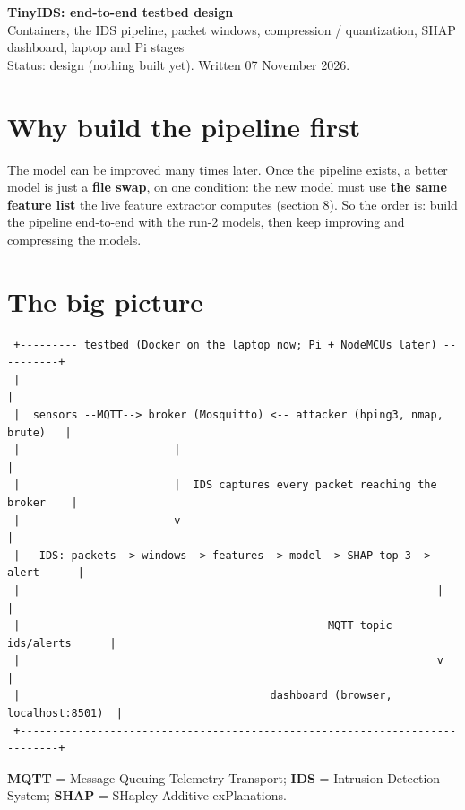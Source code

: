 \documentclass[11pt]{article}
\begin{document}
{\LARGE\bfseries TinyIDS: end-to-end testbed design}\\[4pt]
{\large Containers, the IDS pipeline, packet windows, compression / quantization, SHAP dashboard, laptop and Pi stages}\\[2pt]
Status: design (nothing built yet). Written 07 November 2026.

\tableofcontents

\newpage
\section{Why build the pipeline first}
The model can be improved many times later. Once the pipeline exists, a better model is just a \textbf{file swap}, on one condition:
the new model must use \textbf{the same feature list} the live feature extractor computes (section 8). So the order is:
build the pipeline end-to-end with the run-2 models, then keep improving and compressing the models.

\section{The big picture}
\begin{verbatim}
 +--------- testbed (Docker on the laptop now; Pi + NodeMCUs later) ----------+
 |                                                                            |
 |  sensors --MQTT--> broker (Mosquitto) <-- attacker (hping3, nmap, brute)   |
 |                        |                                                   |
 |                        |  IDS captures every packet reaching the broker    |
 |                        v                                                   |
 |   IDS: packets -> windows -> features -> model -> SHAP top-3 -> alert      |
 |                                                                 |          |
 |                                                MQTT topic  ids/alerts      |
 |                                                                 v          |
 |                                       dashboard (browser, localhost:8501)  |
 +----------------------------------------------------------------------------+
\end{verbatim}
\textbf{MQTT} = Message Queuing Telemetry Transport; \textbf{IDS} = Intrusion Detection System;
\textbf{SHAP} = SHapley Additive exPlanations.

\end{document}
